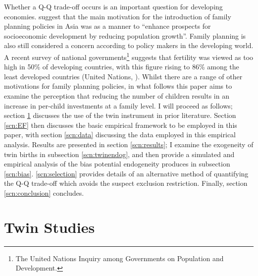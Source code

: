 \documentclass{article}[11pt,subeqn]
\begin{document}
\begin{spacing}{1.25}
Whether a Q-Q trade-off occurs is an important question for developing economies.  \citet{Clelandetal2006} suggest that the main motivation for the introduction of family 
planning policies in Asia was as a manner to ``enhance prospects for socioeconomic development by reducing population growth''.  Family planning is also still considered a 
concern according to policy makers in the developing world.  A recent survey of national governments\footnote{The United Nations Inquiry among Governments on Population and 
Development.} suggests that fertility was viewed as too high in 50\% of developing countries, with this figure rising to 86\% among the least developed countries (United 
Nations, \citeyear{UN2010}).   Whilst there are a range of other motivations for family planning policies, in what follows this paper aims to examine the perception that 
reducing the number of children results in an increase in per-child investments at a family level.  I will proceed as follows; section \ref{scn:lit} discusses the use of 
the twin instrument in prior literature.  Section \ref{scn:EF} then discusses the basic empirical framework to be employed in this paper, with section \ref{scn:data} discussing 
the data employed in this empirical analysis.  Results are presented in section \ref{scn:results}; I examine the exogeneity of twin births in subsection \ref{scn:twinendog}, 
and then provide a simulated and empirical analysis of the bias potential endogeneity produces in subsection \ref{scn:bias}.  \ref{scn:selection} provides details of an 
alternative method of quantifying the Q-Q trade-off which avoids the suspect exclusion restriction.  Finally, section \ref{scn:conclusion} concludes. 

\section{Twin Studies}
\label{scn:lit}





\end{spacing}
\end{document}
